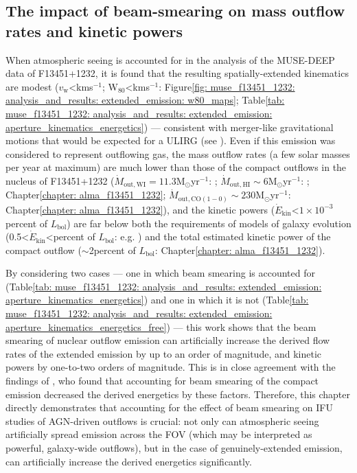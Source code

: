 \subsection{The impact of beam-smearing on mass outflow rates and kinetic powers}
\label{section: muse_f13451_1232: discussion: impact_on_energetics}

When atmospheric seeing is accounted for in the analysis of the MUSE-DEEP data of F13451+1232, it is found that the resulting spatially-extended kinematics are modest ($v_\mathrm{w}$\;\textless{}\;km\;s$^{-1}$; W$_\mathrm{80}$\;\textless{}\;km\;s$^{-1}$: Figure\;\ref{fig: muse_f13451_1232: analysis_and_results: extended_emission: w80_maps}; Table\;\ref{tab: muse_f13451_1232: analysis_and_results: extended_emission: aperture_kinematics_energetics}) --- consistent with merger-like gravitational motions that would be expected for a ULIRG (see \citealt{Perna2021}). Even if this emission was considered to represent outflowing gas, the mass outflow rates (a few solar masses per year at maximum) are much lower than those of the compact outflows in the nucleus of F13451+1232 ($\dot{M}_\mathrm{out, WI}=11.3$\;M$_\odot$\;yr$^{-1}$: \citealt{Rose2018}; $\dot{M}_\mathrm{out, HI}\sim6$\;M$_\odot$\;yr$^{-1}$: \citealt{Morganti2013_4c1250}; Chapter\;\ref{chapter: alma_f13451_1232}; $\dot{M}_\mathrm{out, CO(1-0)}\sim230$\;M$_\odot$\;yr$^{-1}$: Chapter\;\ref{chapter: alma_f13451_1232}), and the kinetic powers ($\dot{E}_\mathrm{kin}$\;\textless\;$1\times10^{-3}$\;per\;cent of $L_\mathrm{bol}$) are far below both the requirements of models of galaxy evolution (0.5\;\textless\;$\dot{E}_\mathrm{kin}$\;\textless{}\;per\;cent of $L_\mathrm{bol}$: e.g. \citealt{DiMatteo2005, Hopkins2010, Schaye2015, Dubois2016}) and the total estimated kinetic power of the compact outflow ($\sim$2\;per\;cent of $L_\mathrm{bol}$: Chapter\;\ref{chapter: alma_f13451_1232}).

By considering two cases --- one in which beam smearing is accounted for (Table\;\ref{tab: muse_f13451_1232: analysis_and_results: extended_emission: aperture_kinematics_energetics}) and one in which it is not (Table\;\ref{tab: muse_f13451_1232: analysis_and_results: extended_emission: aperture_kinematics_energetics_free}) --- this work shows that the beam smearing of nuclear outflow emission can artificially increase the derived flow rates of the extended emission by up to an order of magnitude, and kinetic powers by one-to-two orders of magnitude. This is in close agreement with the findings of \citet{Husemann2016}, who found that accounting for beam smearing of the compact emission decreased the derived energetics by these factors. Therefore, this chapter directly demonstrates that accounting for the effect of beam smearing on IFU studies of AGN-driven outflows is crucial: not only can atmospheric seeing artificially spread emission across the FOV (which may be interpreted as powerful, galaxy-wide outflows), but in the case of genuinely-extended emission, can artificially increase the derived energetics significantly. 

